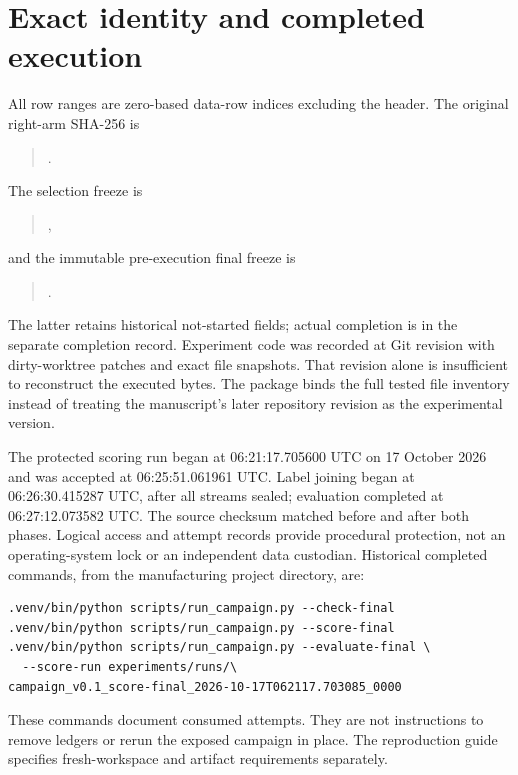\section{Exact identity and completed execution}
\label{app:identity}
All row ranges are zero-based data-row indices excluding the header. The original right-arm SHA-256 is
\begin{quote}\small{}.\end{quote}
The selection freeze is
\begin{quote}\small{},\end{quote}
and the immutable pre-execution final freeze is
\begin{quote}\small{}.\end{quote}
The latter retains historical not-started fields; actual completion is in the separate completion record. Experiment code was recorded at Git revision  with dirty-worktree patches and exact file snapshots. That revision alone is insufficient to reconstruct the executed bytes. The package binds the full tested file inventory instead of treating the manuscript's later repository revision as the experimental version.

The protected scoring run began at 06:21:17.705600 UTC on 17 October 2026 and was accepted at 06:25:51.061961 UTC. Label joining began at 06:26:30.415287 UTC, after all streams sealed; evaluation completed at 06:27:12.073582 UTC. The source checksum matched before and after both phases. Logical access and attempt records provide procedural protection, not an operating-system lock or an independent data custodian. Historical completed commands, from the manufacturing project directory, are:
\begin{verbatim}
.venv/bin/python scripts/run_campaign.py --check-final
.venv/bin/python scripts/run_campaign.py --score-final
.venv/bin/python scripts/run_campaign.py --evaluate-final \
  --score-run experiments/runs/\
campaign_v0.1_score-final_2026-10-17T062117.703085_0000
\end{verbatim}
These commands document consumed attempts. They are not instructions to remove ledgers or rerun the exposed campaign in place. The reproduction guide specifies fresh-workspace and artifact requirements separately.

